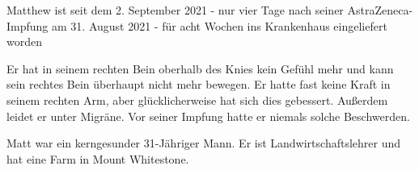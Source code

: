 Matthew ist seit dem 2. September 2021 - nur vier Tage nach seiner
AstraZeneca-Impfung am 31. August 2021 - für acht Wochen ins Krankenhaus
eingeliefert worden

Er hat in seinem rechten Bein oberhalb des Knies kein Gefühl mehr und kann sein
rechtes Bein überhaupt nicht mehr bewegen. Er hatte fast keine Kraft in seinem
rechten Arm, aber glücklicherweise hat sich dies gebessert. Außerdem leidet er
unter Migräne. Vor seiner Impfung hatte er niemals solche Beschwerden.

Matt war ein kerngesunder 31-Jähriger Mann.  Er ist Landwirtschaftslehrer und
hat eine Farm in Mount Whitestone.

